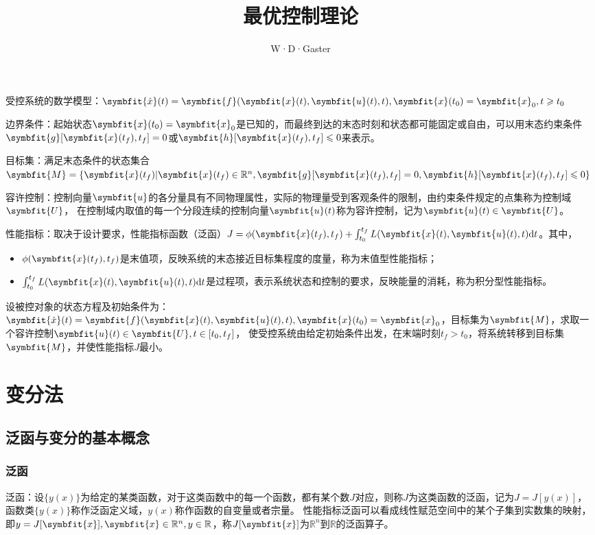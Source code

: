 \documentclass[11pt,a4paper]{ctexart}
\title{最优控制理论}
\author{W·D·Gaster}
\renewcommand{\d}{{\rm d}}
\newcommand{\bm}{\symbfit}
\begin{document}
\maketitle
\thispagestyle{empty}
\newpage

\tableofcontents
\thispagestyle{empty}
\newpage

\setcounter{page}{1}
受控系统的数学模型：$\bm{\dot x}(t)=\bm{f}(\bm{x}(t),\bm{u}(t),t),\bm{x}(t_0)=\bm{x}_0,t\geqslant t_0$

边界条件：起始状态$\bm{x}(t_0)=\bm{x}_0$是已知的，而最终到达的末态时刻和状态都可能固定或自由，可以用末态约束条件$\bm{g}[\bm{x}(t_f),t_f]=0$或$\bm{h}[\bm{x}(t_f),t_f]\leqslant0$来表示。

目标集：满足末态条件的状态集合$\bm{M}=\{\bm{x}(t_f)|\bm{x}(t_f)\in\mathbb{R}^n,\bm{g}[\bm{x}(t_f),t_f]=0,\bm{h}[\bm{x}(t_f),t_f]\leqslant0\}$

容许控制：控制向量$\bm{u}$的各分量具有不同物理属性，实际的物理量受到客观条件的限制，由约束条件规定的点集称为控制域$\bm{U}$，
在控制域内取值的每一个分段连续的控制向量$\bm{u}(t)$称为容许控制，记为$\bm{u}(t)\in\bm{U}$。

性能指标：取决于设计要求，性能指标函数（泛函）$J=\phi(\bm{x}(t_f),t_f)+\int_{t_0}^{t_f}L(\bm{x}(t),\bm{u}(t),t)\d t$。其中，
\begin{itemize}
    \item $\phi(\bm{x}(t_f),t_f)$是末值项，反映系统的末态接近目标集程度的度量，称为末值型性能指标；
    \item $\int_{t_0}^{t_f}L(\bm{x}(t),\bm{u}(t),t)\d t$是过程项，表示系统状态和控制的要求，反映能量的消耗，称为积分型性能指标。
\end{itemize}

设被控对象的状态方程及初始条件为：$\bm{\dot x}(t)=\bm{f}(\bm{x}(t),\bm{u}(t),t),\bm{x}(t_0)=\bm{x}_0$，目标集为$\bm{M}$，求取一个容许控制$\bm{u}(t)\in\bm{U},t\in[t_0,t_f]$，
使受控系统由给定初始条件出发，在末端时刻$t_f>t_0$，将系统转移到目标集$\bm{M}$，并使性能指标$J$最小。
\section{变分法}
    \subsection{泛函与变分的基本概念}
        \subsubsection{泛函}
            泛函：设$\{y(x)\}$为给定的某类函数，对于这类函数中的每一个函数，都有某个数$J$对应，则称$J$为这类函数的泛函，记为$J=J[y(x)]$，函数类$\{y(x)\}$称作泛函定义域，$y(x)$称作函数的自变量或者宗量。
            性能指标泛函可以看成线性赋范空间中的某个子集到实数集的映射，即$y=J[\bm{x}],\bm{x}\in\mathbb{R}^n,y\in\mathbb{R}$，称$J[\bm{x}]$为$\mathbb{R}^n$到$\mathbb{R}$的泛函算子。
\end{document}
